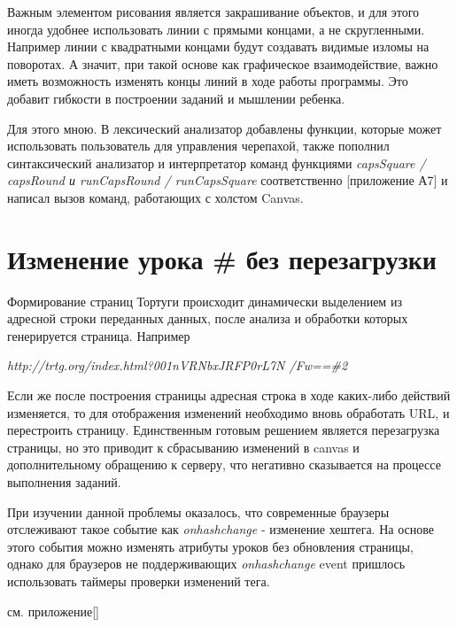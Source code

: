 Важным элементом рисования является закрашивание объектов, и для этого иногда удобнее использовать линии с прямыми концами, а не скругленными. Например линии с квадратными концами будут создавать видимые изломы на поворотах. А значит, при такой основе как графическое взаимодействие, важно иметь возможность  изменять  концы линий в ходе работы программы. Это добавит гибкости в построении заданий и мышлении ребенка.


Для этого мною. В лексический анализатор  добавлены функции, которые может использовать пользователь для управления черепахой, также пополнил синтаксический анализатор и интерпретатор команд функциями \textit{capsSquare / capsRound и runCapsRound / runCapsSquare} соответственно [приложение А7] и написал вызов команд, работающих с холстом Canvas.

\chapter{Изменение урока \# без перезагрузки} \label{chapt1}


Формирование страниц Тортуги происходит динамически выделением из адресной строки переданных данных, после анализа и обработки которых генерируется страница.
Например 
 
 \begin{center}
 \vspace{6mm}
  \textit{ http://trtg.org/index.html?001nVRNbxJRFP0rL7N /Fw==\#2 }
 \end{center} 
 \vspace{6mm}
 
Если же после построения страницы адресная строка в ходе каких-либо действий изменяется, то для отображения изменений необходимо вновь обработать URL, и  перестроить страницу. Единственным готовым решением является  перезагрузка страницы, но это приводит к сбрасыванию изменений в canvas и дополнительному обращению к серверу, что негативно сказывается на процессе выполнения заданий. 

При изучении данной проблемы оказалось, что современные браузеры отслеживают такое событие как  \textit{onhashchange} - изменение хештега. На основе этого события  можно изменять атрибуты уроков без  обновления страницы, однако для браузеров не поддерживающих \textit{onhashchange} event пришлось использовать таймеры проверки изменений тега.

см. приложение[]

